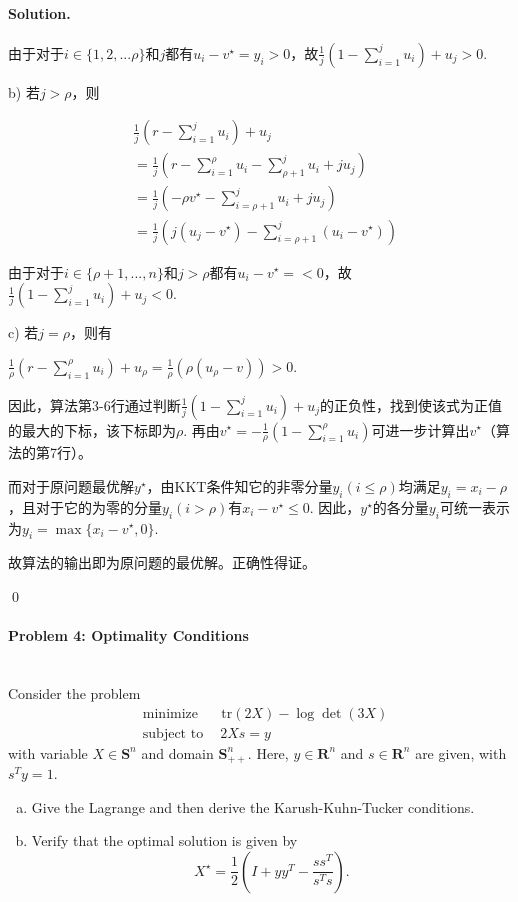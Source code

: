 \documentclass[a4paper]{article}
\newenvironment{solution}
{\color{blue} \paragraph{Solution.}}
{\newline \qed}
\begin{document}
\begin{solution}
        由于对于$i\in \{1, 2, ...\rho\}$和$j$都有$u_i-v^\star=y_i>0$，故$\frac 1j(1-\sum_{i=1}^ju_i)+u_j>0$.

    b) 若$j>\rho$，则

    \begin{equation}
        \begin{split}
            &\frac 1j(r-\sum_{i=1}^ju_i)+u_j\\
            &=\frac 1j(r-\sum_{i=1}^\rho u_i-\sum_{\rho+1}^j u_i+ju_j)\\
            &=\frac 1j(-\rho v^\star-\sum_{i=\rho+1}^j u_i+ju_j)\\
            &=\frac 1j(j(u_j-v^\star)-\sum_{i=\rho+1}^j(u_i-v^\star))
        \end{split}
    \end{equation}
    
    由于对于$i\in \{\rho+1, ...,n\}$和$j>\rho$都有$u_i-v^\star=<0$，故$\frac 1j(1-\sum_{i=1}^ju_i)+u_j<0$.

    c) 若$j=\rho$，则有
        
    $\frac 1\rho(r-\sum_{i=1}^\rho u_i)+u_{\rho}=\frac 1\rho(\rho(u_\rho-v))>0$.

    因此，算法第3-6行通过判断$\frac 1j(1-\sum_{i=1}^ju_i)+u_j$的正负性，找到使该式为正值的最大的下标，该下标即为$\rho$. 再由$v^\star=-\frac 1\rho (1-\sum_{i=1}^\rho u_i)$可进一步计算出$v^\star$（算法的第7行）。

    而对于原问题最优解$y^\star$，由KKT条件知它的非零分量$y_i(i\leq\rho)$均满足$y_i=x_i-\rho$，且对于它的为零的分量$y_i(i>\rho)$有$x_i-v^\star\leq 0$. 因此，$y^\star$的各分量$y_i$可统一表示为$y_i=\max\{x_i-v^\star, 0\}$.

    故算法的输出即为原问题的最优解。正确性得证。

\end{solution}

\paragraph{Problem 4: Optimality Conditions}
~\\
Consider the problem
\begin{equation*}
    \begin{split}
        &\text{minimize~~} \quad  \text{tr}(2X) - \log{\det{(3X)}} \\
        &\text{subject to} \quad~  2Xs=y
    \end{split}
\end{equation*}
with variable $X \in \mathbf{S}^n$ and domain $\mathbf{S}_{++}^n$. Here, $y \in \mathbf{R}^n$ and $s \in \mathbf{R}^n$ are given, with $s^T y =1$.
\begin{enumerate}[a)]
    \item Give the Lagrange and then derive the Karush-Kuhn-Tucker conditions.
    \item Verify that the optimal solution is given by
    \begin{equation*}
        X^\star = \frac{1}{2} \left(I + yy^T - \frac{ss^T}{s^T s}\right) .
    \end{equation*}
\end{enumerate}
\end{document}
